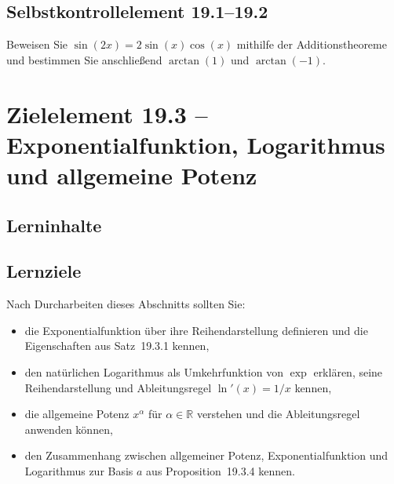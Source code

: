 \documentclass[a4paper,12pt]{article}
\begin{document}
\subsection*{Selbstkontrollelement 19.1--19.2}

Beweisen Sie $\sin(2x) = 2\sin(x)\cos(x)$ mithilfe der Additionstheoreme und
bestimmen Sie anschließend $\arctan(1)$ und $\arctan(-1)$.

\newpage

\section*{Zielelement 19.3 -- Exponentialfunktion, Logarithmus und allgemeine Potenz}

\subsection*{Lerninhalte}

\begin{center}
\end{center}

\subsection*{Lernziele}

Nach Durcharbeiten dieses Abschnitts sollten Sie:
\begin{itemize}
  \item die Exponentialfunktion über ihre Reihendarstellung definieren und die
        Eigenschaften aus Satz~19.3.1 kennen,
  \item den natürlichen Logarithmus als Umkehrfunktion von $\exp$ erklären,
        seine Reihendarstellung und Ableitungsregel $\ln'(x) = 1/x$ kennen,
  \item die allgemeine Potenz $x^\alpha$ für $\alpha \in \mathbb{R}$ verstehen und
        die Ableitungsregel anwenden können,
  \item den Zusammenhang zwischen allgemeiner Potenz, Exponentialfunktion und
        Logarithmus zur Basis $a$ aus Proposition~19.3.4 kennen.
\end{itemize}
\end{document}
